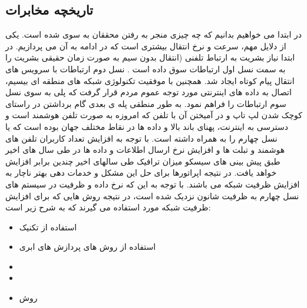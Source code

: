 \subsection{تاریخچه مخابرات}
در ابتدا می خواهیم بدانیم که چه چیزی منجر به رفتن محققان به سوی   شده است. یکی از دلایل مهم، سرعت و نرخ انتقال بیشتری است که در ادامه به آن می پردازیم.
در ابتدا نیاز بشریت به ارتباط تلفنی (انتقال بدون سیم به صورت زمان حقیقی  بشریت را به سمت نسل اول ارتباطات  سوق داده است . نسل دوم ارتباطات  با سرویس های انتقال پیام کوتاه ایجاد شد. همچنین با موفقیت تکنولوژی شبکه های منطقه ای بیسیم، اتصال به داده های اینترنتی مورد توجه عموم مردم قرار گرفت که پلی به سوی نسل سوم ارتباطات  را فراهم نمود. به طور منطقی پله ی بعدی گام برداشتن در راستای کوچک شدن لپ تاپ و در آمیختن آن با تلفن که امروزه به صورت تلفن هوشمند است و دسترسی به  اینترنت، پهنای باند بالا و داده ها در نقاط مختلف جهان بوده است که  یا نسل چهارم را به همراه داشته است.
با توجه به افزایش تعداد کاربران تلفن های
هوشمند و تبلت ها و افزایش نرخ ارسال اطلاعات و داده ها در طی سال
های اخیر طبق پیش بینی های سیسکو میزان ترافیک  طی سالهای اخیر
  چندین برابر افزایش خواهد یافت.
در نتیجه اپراتورها برای حل این مشکل و خدمات
دهی بهتر ناچار به افزایش ظرفیت شبکه می باشند. با توجه
به این که نرخ داده و ظرفیت در سیستم های نسل چهارم به ظرفیت
شانون نزدیک شده است، در نتیجه روش هایی که برای
افزایش ظرفیت شبکه مورد استفاده می گیرند که به شرح زیر است:
\begin{itemize}
\item
استفاده از تکنیک 
\item
استفاده از روش های پردازش های ابری
\item
{}
\item
{}
\item
روش 
\end{itemize}
